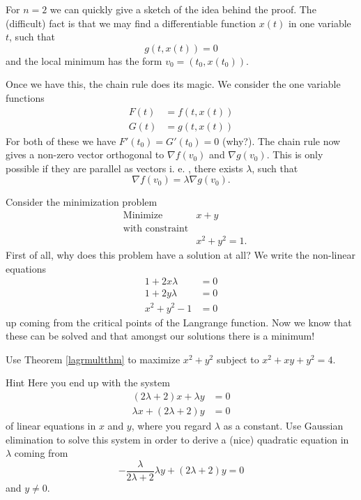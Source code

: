 \documentclass{article}
\begin{document}
  For $n=2$ we can quickly give a sketch of the idea behind the proof. The (difficult) fact is that
  we may find a differentiable function $x(t)$ in one variable $t$, such that
  $$
  g(t, x(t)) = 0
  $$
  and the local minimum has the form $v_0 = (t_0, x(t_0))$.
  
  Once we have this, the chain rule does its magic. We consider the one variable functions
  \begin{align}
    F(t) &= f(t, x(t))\\
    G(t) &= g(t, x(t))
  \end{align}
  For both of these we have $F'(t_0) = G'(t_0) = 0$ (why?). The
  chain rule now gives a non-zero vector orthogonal to $\nabla f(v_0)$ and $\nabla g(v_0)$. This is
  only possible if they are parallel as vectors i. e. , there exists $\lambda$, such that
  $$
  \nabla f (v_0) = \lambda \nabla g (v_0).
  $$

  \begin{example}\label{minlagr}
    Consider the minimization problem
\begin{align*}
    &\text{Minimize} &x+y\\
    &\text{with constraint}\\
    &&x^2 + y^2 = 1.
  \end{align*}
  First of all, why does this problem have a solution at all? We write
  the non-linear equations
  \begin{align*}
    1 + 2 x\lambda &= 0\\
    1 + 2 y\lambda &= 0\\
    x^2 + y^2 - 1&= 0
  \end{align*}
  up coming from the critical points of the Langrange function. Now we know that
  these can be solved and that amongst our solutions there is a minimum!
  \end{example}


  \beginshex
  Use Theorem \ref{lagrmultthm} to
maximize $x^2 + y^2$ subject to $x^2 + x y + y^2 = 4$. 

\begin{hideinbutton}{Hint}
Here you end up with the system
\begin{align*}
(2\lambda + 2) x  + \lambda y &= 0\\
\lambda x + (2\lambda + 2) y &= 0
\end{align*}
of linear equations in $x$ and $y$, where you
regard $\lambda$ as a constant. Use Gaussian
elimination to solve this system in order to
derive a (nice) quadratic equation in $\lambda$ coming from
$$
-\frac{\lambda}{2\lambda +2} \lambda y + (2 \lambda + 2) y = 0
$$
and $y\neq 0$.
\end{hideinbutton}
\end{document}
